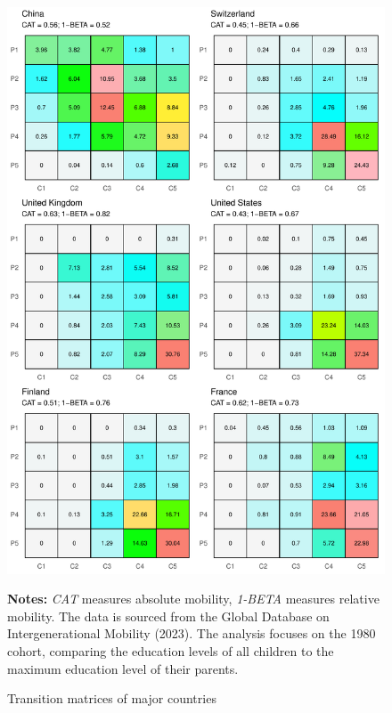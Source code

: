 \begin{figure}[h!]
	\centering
	\includegraphics[width=0.7\linewidth]{figs/main.pdf}
	\caption{Transition matrices of major countries}
	\label{fig:main}
	\begin{minipage}{1\linewidth}
		\vspace{0.2cm}
		\footnotesize
		\textbf{Notes:} \textit{CAT} measures absolute mobility, \textit{1-BETA} measures relative mobility. The data is sourced from the Global Database on Intergenerational Mobility (2023). The analysis focuses on the 1980 cohort, comparing the education levels of all children to the maximum education level of their parents.		
	\end{minipage}
\end{figure}


